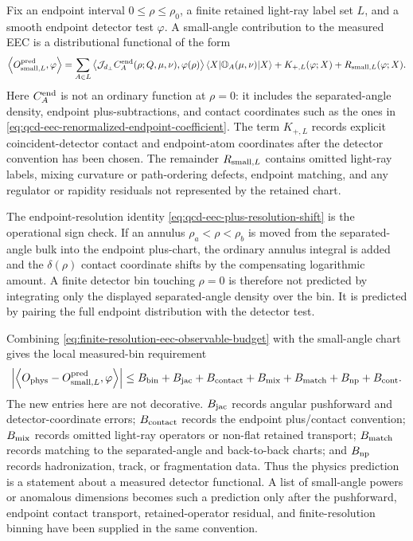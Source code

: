 \begin{controlledapproximation}
Fix an endpoint interval \(0\le\rho\le\rho_0\), a finite retained
light-ray label set \(L\), and a smooth endpoint detector test \(\varphi\).
A small-angle contribution to the measured EEC is a distributional functional
of the form
\begin{equation}
  \left\langle
    O_{{\rm small},L}^{\rm pred},
    \varphi
  \right\rangle
  =
  \sum_{A\in L}
  \left\langle
    \mathcal J_{d_\perp} C_A^{\rm end}(\rho;Q,\mu,\nu),
    \varphi(\rho)
  \right\rangle
  \langle X|\mathbb O_A(\mu,\nu)|X\rangle
  +
  K_{+,L}(\varphi;X)
  +
  R_{{\rm small},L}(\varphi;X).
  \label{eq:measured-small-angle-eec-chart}
\end{equation}
Here \(C_A^{\rm end}\) is not an ordinary function at \(\rho=0\): it includes
the separated-angle density, endpoint plus-subtractions, and contact
coordinates such as the ones in
\eqref{eq:qcd-eec-renormalized-endpoint-coefficient}.  The term
\(K_{+,L}\) records explicit coincident-detector contact and endpoint-atom
coordinates after the detector convention has been chosen.  The remainder
\(R_{{\rm small},L}\) contains omitted light-ray labels, mixing curvature or
path-ordering defects, endpoint matching, and any regulator or rapidity
residuals not represented by the retained chart.

The endpoint-resolution identity
\eqref{eq:qcd-eec-plus-resolution-shift} is the operational sign check.  If
an annulus \(\rho_a<\rho<\rho_b\) is moved from the separated-angle bulk into
the endpoint plus-chart, the ordinary annulus integral is added and the
\(\delta(\rho)\) contact coordinate shifts by the compensating logarithmic
amount.  A finite detector bin touching \(\rho=0\) is therefore not predicted
by integrating only the displayed separated-angle density over the bin.  It is
predicted by pairing the full endpoint distribution with the detector test.

Combining \eqref{eq:finite-resolution-eec-observable-budget} with the
small-angle chart gives the local measured-bin requirement
\begin{equation}
  \left|
  \left\langle
    O_{\rm phys}-O_{{\rm small},L}^{\rm pred},
    \varphi
  \right\rangle
  \right|
  \le
  B_{\rm bin}
  +B_{\rm jac}
  +B_{\rm contact}
  +B_{\rm mix}
  +B_{\rm match}
  +B_{\rm np}
  +B_{\rm cont}.
  \label{eq:measured-small-angle-eec-budget}
\end{equation}
The new entries here are not decorative.  \(B_{\rm jac}\) records angular
pushforward and detector-coordinate errors; \(B_{\rm contact}\) records the
endpoint plus/contact convention; \(B_{\rm mix}\) records omitted light-ray
operators or non-flat retained transport; \(B_{\rm match}\) records matching
to the separated-angle and back-to-back charts; and \(B_{\rm np}\) records
hadronization, track, or fragmentation data.  Thus the physics prediction is a
statement about a measured detector functional.  A list of small-angle powers
or anomalous dimensions becomes such a prediction only after the pushforward,
endpoint contact transport, retained-operator residual, and finite-resolution
binning have been supplied in the same convention.
\end{controlledapproximation}

